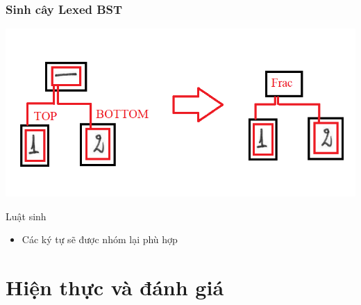 \documentclass{beamer}
\begin{document}
	\begin{frame}
		\frametitle{Sinh cây Lexed BST}
		\begin{center}
			\centering
			\includegraphics[width=0.6\linewidth]{lex1.png}
		\end{center}
		
		\begin{block}{Luật sinh}
			\begin{itemize}
				\item Các ký tự sẽ được nhóm lại phù hợp
			\end{itemize}
		\end{block}
		
	\end{frame}
	
	
	
	
	
	
	
	
	\section{Hiện thực và đánh giá}
\end{document}

